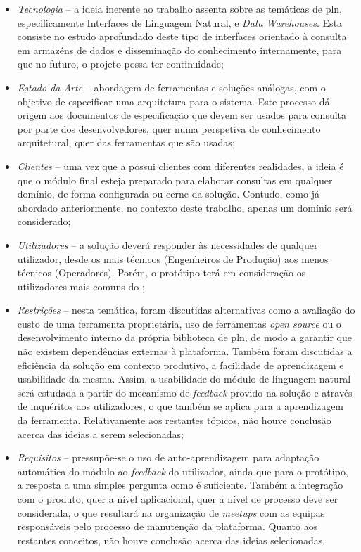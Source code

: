 \begin{itemize}
    \item
    {
        \textit{Tecnologia} -- a ideia inerente ao trabalho assenta sobre as temáticas de \gls{pln}, especificamente Interfaces de Linguagem Natural, e \textit{Data Warehouses}. Esta consiste no estudo aprofundado deste tipo de interfaces orientado à consulta em armazéns de dados e disseminação do conhecimento internamente, para que no futuro, o projeto possa ter continuidade;
    }
    \item
    {
        \textit{Estado da Arte} -- abordagem de ferramentas e soluções análogas, com o objetivo de especificar uma arquitetura para o sistema. Este processo dá origem aos documentos de especificação que devem ser usados para consulta por parte dos desenvolvedores, quer numa perspetiva de conhecimento arquitetural, quer das ferramentas que são usadas;
    }
    \item
    {
        \textit{Clientes} -- uma vez que a {\companyname} possui clientes com diferentes realidades, a ideia é que o módulo final esteja preparado para elaborar consultas em qualquer domínio, de forma configurada ou cerne da solução. Contudo, como já abordado anteriormente, no contexto deste trabalho, apenas um domínio será considerado;
    }
    \item
    {
        \textit{Utilizadores} -- a solução deverá responder às necessidades de qualquer utilizador, desde os mais técnicos (Engenheiros de Produção) aos menos técnicos (Operadores). Porém, o protótipo terá em consideração os utilizadores mais comuns do {\productname};
    }
    \item
    {
        \textit{Restrições} -- nesta temática, foram discutidas alternativas como a avaliação do custo de uma ferramenta proprietária, uso de ferramentas \textit{open source} ou o desenvolvimento interno da própria biblioteca de \gls{pln}, de modo a garantir que não existem dependências externas à plataforma. Também foram discutidas a eficiência da solução em contexto produtivo, a facilidade de aprendizagem e usabilidade da mesma. Assim, a usabilidade do módulo de linguagem natural será estudada a partir do mecanismo de \textit{feedback} provido na solução e através de inquéritos aos utilizadores, o que também se aplica para a aprendizagem da ferramenta. Relativamente aos restantes tópicos, não houve conclusão acerca das ideias a serem selecionadas;
    }
    \item
    {
        \textit{Requisitos} -- pressupõe-se o uso de auto-aprendizagem para adaptação automática do módulo ao \textit{feedback} do utilizador, ainda que para o protótipo, a resposta a uma simples pergunta como  é suficiente. Também a integração com o produto, quer a nível aplicacional, quer a nível de processo deve ser considerada, o que resultará na organização de \textit{meetups} com as equipas responsáveis pelo processo de manutenção da plataforma. Quanto aos restantes conceitos, não houve conclusão acerca das ideias selecionadas.
    }
\end{itemize}

